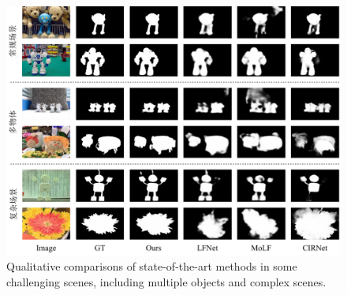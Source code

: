 \begin{figure}
	\centering
	\includegraphics[width=\linewidth]{figures/chapter3/compare_2}
	\caption{
		Qualitative comparisons of state-of-the-art methods in some challenging scenes, including multiple objects and complex scenes.
	}
	\label{figure:figure_comparison_2}
	\vspace{-0.2cm}
\end{figure}

